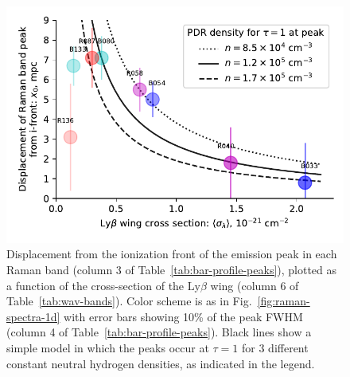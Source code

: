 \documentclass[useAMS, usenatbib, a4paper]{mnras}
\newcommand\lyb{\ensuremath{\text{Ly}\beta}}
\begin{document}
\begin{figure}
  \includegraphics[width=\linewidth]{figs/raman-band-displacements-plot}
  \caption{Displacement from the ionization front of the emission peak
    in each Raman band (column 3 of
    Table~\ref{tab:bar-profile-peaks}), plotted as a function of the
    cross-section of the \lyb{} wing (column 6 of
    Table~\ref{tab:wav-bands}).  Color scheme is as in
    Fig.~\ref{fig:raman-spectra-1d} with error bars showing 10\% of
    the peak FWHM (column 4 of Table~\ref{tab:bar-profile-peaks}).
    Black lines show a simple model in which the peaks occur at
    \(\tau = 1\) for 3 different constant neutral hydrogen densities, as
    indicated in the legend. }
  \label{fig:raman-band-displacements}
\end{figure}
\end{document}
